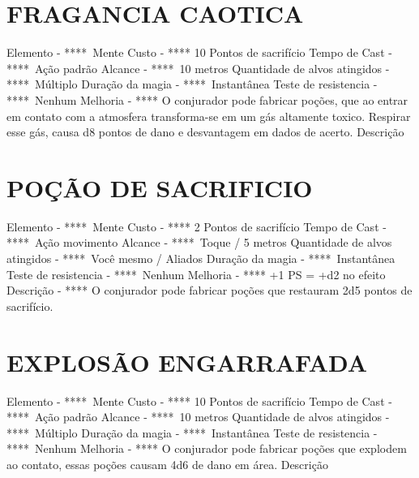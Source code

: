 \documentclass{article}%
\begin{document}
\section{FRAGANCIA CAOTICA}%
\label{sec:FRAGANCIACAOTICA}%
Elemento {-} ****~Mente\newline%
Custo {-} **** 10 Pontos de sacrifício\newline%
Tempo de Cast {-} ****~Ação padrão\newline%
Alcance {-} ****~10 metros\newline%
Quantidade de alvos atingidos {-} ****~Múltiplo\newline%
Duração da magia {-} ****~Instantânea\newline%
Teste de resistencia {-} ****~Nenhum\newline%
Melhoria {-} **** O conjurador pode fabricar poções, que ao entrar em contato com a atmosfera transforma{-}se em um gás altamente toxico. Respirar esse gás, causa d8 pontos de dano e desvantagem em dados de acerto.\newline%
Descrição \newline%

%
\section{POÇÃO DE SACRIFICIO}%
\label{sec:POODESACRIFICIO}%
Elemento {-} ****~Mente\newline%
Custo {-} **** 2 Pontos de sacrifício\newline%
Tempo de Cast {-} ****~Ação movimento\newline%
Alcance {-} ****~Toque / 5 metros\newline%
Quantidade de alvos atingidos {-} ****~Você mesmo / Aliados\newline%
Duração da magia {-} ****~Instantânea\newline%
Teste de resistencia {-} ****~Nenhum\newline%
Melhoria {-} **** +1 PS = +d2 no efeito\newline%
Descrição {-} **** O conjurador pode fabricar poções que restauram 2d5 pontos de sacrifício.\newline%

%
\section{EXPLOSÃO ENGARRAFADA}%
\label{sec:EXPLOSOENGARRAFADA}%
Elemento {-} ****~Mente\newline%
Custo {-} **** 10 Pontos de sacrifício\newline%
Tempo de Cast {-} ****~Ação padrão\newline%
Alcance {-} ****~10 metros\newline%
Quantidade de alvos atingidos {-} ****~Múltiplo\newline%
Duração da magia {-} ****~Instantânea\newline%
Teste de resistencia {-} ****~Nenhum\newline%
Melhoria {-} **** O conjurador pode fabricar poções que explodem ao contato, essas poções causam 4d6 de dano em área.\newline%
Descrição \newline%
\end{document}
